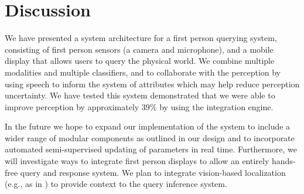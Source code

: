 \documentclass{llncs}
\begin{document}
\section{Discussion}
We have presented a system architecture for a first person querying system, consisting of first person sensors (a camera and microphone), and a mobile display that allows users to query the physical world. We combine multiple modalities and multiple classifiers, and to collaborate with the perception by using speech to inform the system of attributes which may help reduce perception uncertainty. We have tested this system demonstrated that we were able to improve perception by approximately $39\%$ by using the integration engine.

In the future we hope to expand our implementation of the system to include a wider range of modular components as outlined in our design and to incorporate automated semi-supervised updating of parameters in real time. Furthermore, we will investigate ways to integrate first person displays to allow an entirely hands-free query and response system. We plan to integrate vision-based localization (e.g., as in \citep{Park12}) to provide context to the query inference system.
%

%
%
\footnotesize


\end{document}
